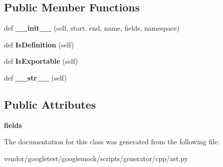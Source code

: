 \subsection*{Public Member Functions}
\begin{DoxyCompactItemize}
\item 
def {\bfseries \+\_\+\+\_\+init\+\_\+\+\_\+} (self, start, end, name, fields, namespace)\hypertarget{classcpp_1_1ast_1_1__NestedType_a63acff60f38885be6cc11231fffc3f4e}{}\label{classcpp_1_1ast_1_1__NestedType_a63acff60f38885be6cc11231fffc3f4e}

\item 
def {\bfseries Is\+Definition} (self)\hypertarget{classcpp_1_1ast_1_1__NestedType_a9f160999863f39c9032f60b014e213d5}{}\label{classcpp_1_1ast_1_1__NestedType_a9f160999863f39c9032f60b014e213d5}

\item 
def {\bfseries Is\+Exportable} (self)\hypertarget{classcpp_1_1ast_1_1__NestedType_a689f8b0dc20e6070938825eee483dd2f}{}\label{classcpp_1_1ast_1_1__NestedType_a689f8b0dc20e6070938825eee483dd2f}

\item 
def {\bfseries \+\_\+\+\_\+str\+\_\+\+\_\+} (self)\hypertarget{classcpp_1_1ast_1_1__NestedType_a18901ec6acba88c526d703444bf4d52c}{}\label{classcpp_1_1ast_1_1__NestedType_a18901ec6acba88c526d703444bf4d52c}

\end{DoxyCompactItemize}
\subsection*{Public Attributes}
\begin{DoxyCompactItemize}
\item 
{\bfseries fields}\hypertarget{classcpp_1_1ast_1_1__NestedType_aed69c37a409b4d26e6cfde2de3185d86}{}\label{classcpp_1_1ast_1_1__NestedType_aed69c37a409b4d26e6cfde2de3185d86}

\end{DoxyCompactItemize}


The documentation for this class was generated from the following file\+:\begin{DoxyCompactItemize}
\item 
vendor/googletest/googlemock/scripts/generator/cpp/ast.\+py\end{DoxyCompactItemize}

